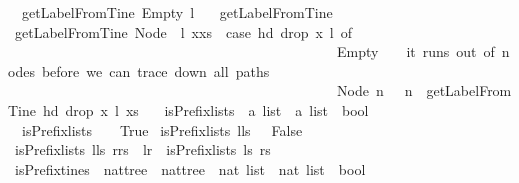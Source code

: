 \begin{isabellebody}
\ \ {\isachardoublequoteopen}getLabelFromTine\ Empty\ l\ {\isacharequal}\ {\isacharbrackleft}{\isacharbrackright}{\isachardoublequoteclose}\isanewline
{\isacharbar}\ {\isachardoublequoteopen}getLabelFromTine\ {\isacharunderscore}\ {\isacharbrackleft}{\isacharbrackright}\ {\isacharequal}\ {\isacharbrackleft}{\isacharbrackright}{\isachardoublequoteclose}\isanewline
{\isacharbar}\ {\isachardoublequoteopen}getLabelFromTine\ {\isacharparenleft}Node\ {\isacharunderscore}\ l{\isacharparenright}\ {\isacharparenleft}x{\isacharhash}xs{\isacharparenright}\ {\isacharequal}\ {\isacharparenleft}case\ hd\ {\isacharparenleft}drop\ x\ l{\isacharparenright}\ of\ \isanewline
\ \ \ \ \ \ \ \ \ \ \ \ \ \ \ \ \ \ \ \ \ \ \ \ \ \ \ \ \ \ \ \ \ \ \ \ \ \ \ \ \ \ \ \ \ \ \ Empty\ {\isasymRightarrow}\ {\isacharbrackleft}{\isacharbrackright}\ {\isacharbar}\ {\isacharparenleft}{\isacharasterisk}it\ runs\ out\ of\ nodes\ before\ we\ can\ trace\ down\ all\ paths{\isacharasterisk}{\isacharparenright}\isanewline
\ \ \ \ \ \ \ \ \ \ \ \ \ \ \ \ \ \ \ \ \ \ \ \ \ \ \ \ \ \ \ \ \ \ \ \ \ \ \ \ \ \ \ \ \ \ \ Node\ n\ {\isacharunderscore}\ {\isasymRightarrow}\ n\ {\isacharhash}\ getLabelFromTine\ {\isacharparenleft}hd\ {\isacharparenleft}drop\ x\ l{\isacharparenright}{\isacharparenright}\ xs{\isacharparenright}{\isachardoublequoteclose}\ \ \isanewline
\isanewline
{}\isamarkupfalse%
\ isPrefix{\isacharunderscore}lists\ {\isacharcolon}{\isacharcolon}\ {\isachardoublequoteopen}{\isacharprime}a\ list\ {\isasymRightarrow}\ {\isacharprime}a\ list\ {\isasymRightarrow}\ bool{\isachardoublequoteclose}\ \isanewline
\ \ {\isachardoublequoteopen}isPrefix{\isacharunderscore}lists\ {\isacharbrackleft}{\isacharbrackright}\ {\isacharunderscore}\ {\isacharequal}\ True{\isachardoublequoteclose}\isanewline
{\isacharbar}\ {\isachardoublequoteopen}isPrefix{\isacharunderscore}lists\ {\isacharparenleft}l{\isacharhash}ls{\isacharparenright}\ {\isacharbrackleft}{\isacharbrackright}\ {\isacharequal}\ False{\isachardoublequoteclose}\isanewline
{\isacharbar}\ {\isachardoublequoteopen}isPrefix{\isacharunderscore}lists\ {\isacharparenleft}l{\isacharhash}ls{\isacharparenright}\ {\isacharparenleft}r{\isacharhash}rs{\isacharparenright}\ {\isacharequal}\ {\isacharparenleft}{\isacharparenleft}l{\isacharequal}r{\isacharparenright}\ {\isasymand}\ isPrefix{\isacharunderscore}lists\ ls\ rs{\isacharparenright}{\isachardoublequoteclose}\isanewline
\ \ \isanewline
{}\isamarkupfalse%
\ isPrefix{\isacharunderscore}tines\ {\isacharcolon}{\isacharcolon}\ {\isachardoublequoteopen}nattree\ {\isasymRightarrow}\ nattree\ {\isasymRightarrow}\ nat\ list\ {\isasymRightarrow}\ nat\ list\ {\isasymRightarrow}\ bool{\isachardoublequoteclose}\ \isanewline

\end{isabellebody}
